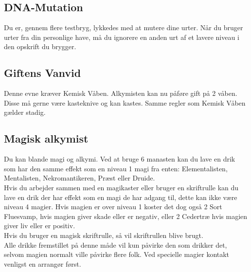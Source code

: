 \subsection{DNA-Mutation}
Du er, gennem flere testbryg, lykkedes med at mutere dine urter. Når du bruger urter fra din personlige have, må du ignorere en anden urt af et lavere niveau i den opskrift du brygger.\\

\subsection{Giftens Vanvid}
Denne evne kræver Kemisk Våben. Alkymisten kan nu påføre gift på 2 våben. Disse må gerne være kasteknive og kan kastes. Samme regler som Kemisk Våben gælder stadig.\\

\subsection{Magisk alkymist}
Du kan blande magi og alkymi. Ved at bruge 6 manasten kan du lave en drik som har den samme effekt som en niveau 1 magi fra enten: Elementalisten, Mentalisten, Nekromantikeren, Præst eller Druide.\\
Hvis du arbejder sammen med en magikaster eller bruger en skriftrulle kan du lave en drik der har effekt som en magi de har adgang til, dette kan ikke være niveau 4 magier. Hvis magien er over niveau 1 koster det dog også 2 Sort Fluesvamp, hvis magien giver skade eller er negativ, eller 2 Cedertræ hvis magien giver liv eller er positiv.\\
Hvis du bruger en magisk skriftrulle, så vil skriftrullen blive brugt.\\
Alle drikke fremstillet på denne måde vil kun påvirke den som drikker det, selvom magien normalt ville påvirke flere folk. Ved specielle magier kontakt venligst en arrangør først.\\